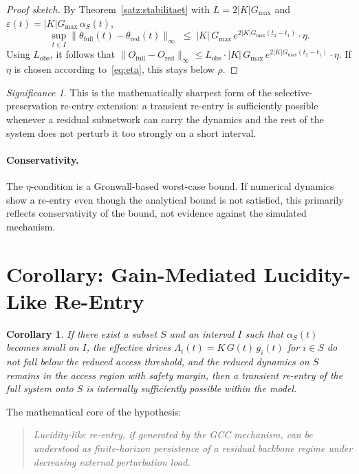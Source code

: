 \documentclass[11pt]{article}
\theoremstyle{plain}
\newtheorem{corollary}[theorem]{Corollary}
\theoremstyle{definition}
\theoremstyle{remark}
\newtheorem*{significance}{Significance}
\newcommand{\Gmax}{G_{\max}}
\newcommand{\Lobs}{L_{\mathrm{obs}}}
\begin{document}
\begin{proof}[Proof sketch]
By Theorem~\ref{satz:stabilitaet} with $L = 2|K|\Gmax$ and $\varepsilon(t) = |K|\Gmax\,\alpha_S(t)$,
\begin{equation}
\sup_{t \in I}\|\theta_{\mathrm{full}}(t) - \theta_{\mathrm{red}}(t)\|_{\infty}
\;\leq\; |K|\,\Gmax\,e^{2|K|\Gmax(t_2 - t_1)}\cdot\eta.
\end{equation}
Using $\Lobs$, it follows that $\|O_{\mathrm{full}} - O_{\mathrm{red}}\|_{\infty} \leq \Lobs \cdot |K|\,\Gmax\,e^{2|K|\Gmax(t_2-t_1)}\cdot\eta$. If $\eta$ is chosen according to~\eqref{eq:eta}, this stays below $\rho$.
\end{proof}

\begin{significance}
This is the mathematically sharpest form of the selective-preservation re-entry extension: a transient re-entry is sufficiently possible whenever a residual subnetwork can carry the dynamics and the rest of the system does not perturb it too strongly on a short interval.
\end{significance}

\paragraph{Conservativity.}
The $\eta$-condition is a Gronwall-based worst-case bound. If numerical dynamics show a re-entry even though the analytical bound is not satisfied, this primarily reflects conservativity of the bound, not evidence against the simulated mechanism.


\section{Corollary: Gain-Mediated Lucidity-Like Re-Entry}

\begin{corollary}
\label{kor:lucidity}
If there exist a subset $S$ and an interval $I$ such that $\alpha_S(t)$ becomes small on $I$, the effective drives $\Lambda_i(t) = K\,G(t)\,g_i(t)$ for $i \in S$ do not fall below the reduced access threshold, and the reduced dynamics on $S$ remains in the access region with safety margin, then a transient re-entry of the full system onto $S$ is internally sufficiently possible within the model.
\end{corollary}

The mathematical core of the hypothesis:

\begin{quote}
\itshape
Lucidity-like re-entry, if generated by the GCC mechanism, can be understood as finite-horizon persistence of a residual backbone regime under decreasing external perturbation load.
\end{quote}
\end{document}
